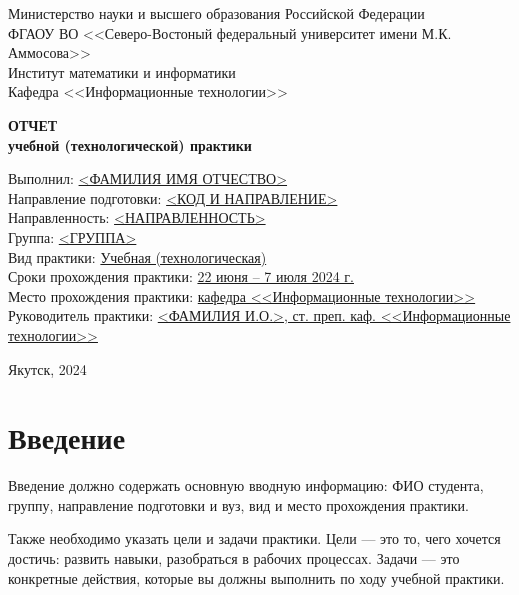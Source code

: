 \documentclass[12pt]{article}
\begin{document}
\thispagestyle{empty}
\begin{center}
  Министерство науки и высшего образования Российской Федерации \\
  ФГАОУ ВО <<Северо-Востоный федеральный университет имени М.К. Аммосова>> \\
  Институт математики и информатики \\
  Кафедра <<Информационные технологии>>
\end{center}

  \vfill
  
\begin{center}
  \Large{
    \textbf{ОТЧЕТ} \\
    \textbf{учебной (технологической) практики}
  }
\end{center}

\vfill

\begin{flushleft}
Выполнил: \underline{<ФАМИЛИЯ ИМЯ ОТЧЕСТВО>} \\
Направление подготовки: \underline{<КОД И НАПРАВЛЕНИЕ>} \\
Направленность: \underline{<НАПРАВЛЕННОСТЬ>} \\
Группа: \underline{<ГРУППА>} \\
Вид практики: \underline{Учебная (технологическая)} \\
Сроки прохождения практики: \underline{22 июня -- 7 июля 2024 г.} \\
Место прохождения практики: \underline{кафедра <<Информационные технологии>>} \\
Руководитель практики: \underline{<ФАМИЛИЯ И.О.>, ст. преп. каф.  <<Информационные технологии>>}
\end{flushleft}

\vfill

\begin{center}
  Якутск, 2024
\end{center}

\newpage \section*{Введение}

Введение должно содержать основную вводную информацию: ФИО студента, группу, направление подготовки и вуз, вид и место прохождения практики.

Также необходимо указать цели и задачи практики. Цели --- это то, чего хочется достичь: развить навыки, разобраться в рабочих процессах. Задачи --- это конкретные действия, которые вы должны выполнить по ходу учебной практики.
\end{document}

